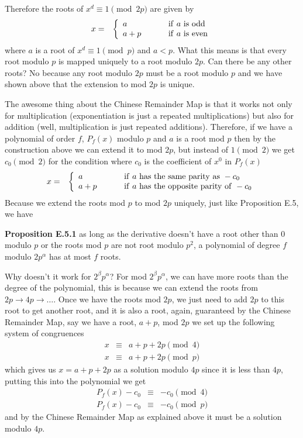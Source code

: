 \documentclass[aps,preprint,preprintnumbers,nofootinbib,showpacs,prd]{revtex4-1}
\newcommand{\nbea}{\begin{eqnarray*}}
\newcommand{\neea}{\end{eqnarray*}}
\begin{document}
Therefore the roots of $x^d \equiv 1 \pmod{2p}$ are given by
%
\nbea
x & = & \left \{
\begin{array}{l l}
a & ~~~~~~~ {\rm if~} a ~{\rm is~ odd} \\
a + p & ~~~~~~~ {\rm if~} a~ {\rm is~ even}
\end{array}
\right.
\neea
%
where $a$ is a root of $x^d \equiv 1 \pmod{p}$ and $a < p$. What this means is that every root modulo $p$ is mapped uniquely to a root modulo $2p$. Can there be any other roots? No because any root modulo $2p$ must be a root modulo $p$ and we have shown above that the extension to mod $2p$ is unique.

The awesome thing about the Chinese Remainder Map is that it works not only for multiplication (exponentiation is just a repeated multiplications) but also for addition (well, multiplication is just repeated additions). Therefore, if we have a polynomial of order $f$, $P_f(x)$ modulo $p$ and $a$ is a root mod $p$ then by the construction above we can extend it to mod $2p$, but instead of $1 \pmod{2}$ we get $c_0 \pmod{2}$ for the condition where $c_0$ is the coefficient of $x^0$ in $P_f(x)$
%
\nbea
x & = & \left \{
\begin{array}{l l}
a & ~~~~~~~ {\rm if~} a ~{\rm has~ the~same~parity~as~} -c_0 \\
a + p & ~~~~~~~ {\rm if~} a~ {\rm has~the~opposite~parity~of~} -c_0
\end{array}
\right.
\neea
%
Because we extend the roots mod $p$ to mod $2p$ uniquely, just like Proposition E.5, we have

{\bf Proposition E.5.1} as long as the derivative doesn't have a root other than 0 modulo $p$ or the roots mod $p$ are not root modulo $p^2$, a polynomial of degree $f$ modulo $2p^\alpha$ has at most $f$ roots.

Why doesn't it work for $2^\beta p^\alpha$? For mod $2^\beta p^\alpha$, we can have more roots than the degree of the polynomial, this is because we can extend the roots from $2p \to 4p \to \dots$. Once we have the roots mod $2p$, we just need to add $2p$ to this root to get another root, and it is also a root, again, guaranteed by the Chinese Remainder Map, say we have a root, $a + p$, mod $2p$ we set up the following system of congruences
%
\nbea
x & \equiv & a + p + 2p \pmod{4} \\
x & \equiv & a + p + 2p \pmod{p}
\neea
%
which gives us $x = a + p + 2p$ as a solution modulo $4p$ since it is less than $4p$, putting this into the polynomial we get
%
\nbea
P_f(x) - c_0 & \equiv & -c_0 \pmod{4} \\
P_f(x) - c_0 & \equiv & -c_0 \pmod{p}
\neea
%
and by the Chinese Remainder Map as explained above it must be a solution modulo $4p$.
\end{document}
